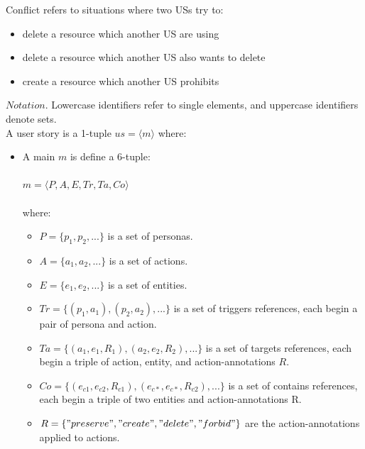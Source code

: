 \begin{definition}
	Conflict refers to situations where two USs try to:	 
	\begin{itemize}
		\item delete a resource which another US are using
		\item delete a resource which another US also wants to delete
		\item create a resource which another US prohibits
	\end{itemize}
	$Notation$. Lowercase identifiers refer to single elements, and uppercase identifiers denote sets. 
	\\A user story is a 1-tuple $us = \langle m\rangle $ where:
	\begin{itemize}
		\item A main $m$ is define a 6-tuple: \\\\$m = \langle P,A,E,Tr,Ta,Co\rangle $ \\\\where:
		
	\begin{itemize}
		\item $P = \{ p_1,p_2,...\} $ is a set of personas.
		
		\item $A = \{ a_1,a_2,...\} $ is a set of actions.
		
		\item $E = \{e_1,e_2,...\}$ is a set of entities.
		
		\item $Tr = \{(p_1,a_1),(p_2,a_2),...\}$ is a set of triggers references, each begin a pair of persona and action.
		
		\item $Ta = \{(a_1,e_1,R_1),(a_2,e_2,R_2),...\}$ is a set of targets references, each begin a triple of action, entity, and action-annotations $R$.
		
		\item $Co = \{ (e_{c1},e_{c2},R_{c1}),(e_{c*},e_{c*},R_{c2}),... \}$ is a set of contains references, each begin a triple of two entities and action-annotations R.
		
		\item $R = \{"preserve", "create", "delete", "forbid"\}$ are the action-annotations applied to actions.
	\end{itemize}
	

\end{itemize}
\end{definition}
